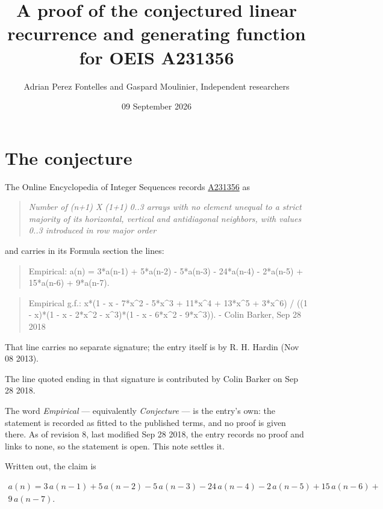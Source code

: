 \documentclass[11pt]{article}
\title{A proof of the conjectured linear recurrence and generating function for OEIS A231356}
\author{Adrian Perez Fontelles and Gaspard Moulinier, Independent researchers}
\date{09 September 2026}
\theoremstyle{definition}
\begin{document}
\maketitle
\section{The conjecture}

The Online Encyclopedia of Integer Sequences records \href{https://oeis.org/A231356}{A231356} as

\begin{quote}\itshape Number of (n+1) X (1+1) 0..3 arrays with no element unequal to a strict majority of its horizontal, vertical and antidiagonal neighbors, with values 0..3 introduced in row major order\end{quote}

and carries in its Formula section the lines:

\begin{quote}\ttfamily Empirical: a(n) = 3*a(n-1) + 5*a(n-2) - 5*a(n-3) - 24*a(n-4) - 2*a(n-5) + 15*a(n-6) + 9*a(n-7).\end{quote}

\begin{quote}\ttfamily Empirical g.f.: x*(1 - x - 7*x\textasciicircum{}2 - 5*x\textasciicircum{}3 + 11*x\textasciicircum{}4 + 13*x\textasciicircum{}5 + 3*x\textasciicircum{}6) / ((1 - x)*(1 - x - 2*x\textasciicircum{}2 - x\textasciicircum{}3)*(1 - x - 6*x\textasciicircum{}2 - 9*x\textasciicircum{}3)). - Colin Barker, Sep 28 2018\end{quote}

That line carries no separate signature; the entry itself is by R. H. Hardin (Nov 08 2013).

The line quoted ending in that signature is contributed by Colin Barker on Sep 28 2018.

The word {\itshape Empirical} --- equivalently {\itshape Conjecture} --- is the entry's own: the statement is recorded as fitted to the published terms, and no proof is given there. As of revision 8, last modified Sep 28 2018, the entry records no proof and links to none, so the statement is open. This note settles it.

Written out, the claim is

\begin{multline*} a(n) = 3\,a(n-1) + 5\,a(n-2) - 5\,a(n-3) - 24\,a(n-4) - 2\,a(n-5) + 15\,a(n-6) + \\ 9\,a(n-7). \end{multline*}
\end{document}
